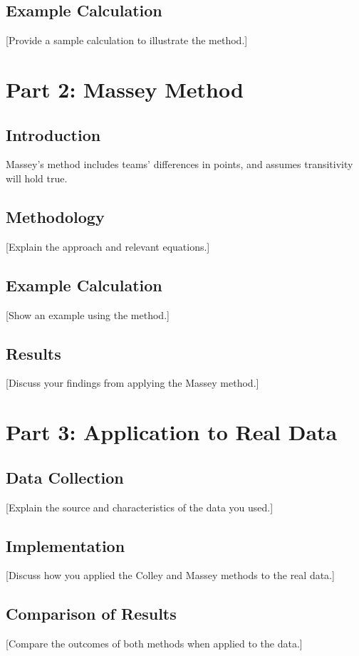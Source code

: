 \documentclass[12pt]{article}
\begin{document}
\subsection{Example Calculation}
[Provide a sample calculation to illustrate the method.]

\section{Part 2: Massey Method}
\subsection{Introduction}
Massey's method includes teams' differences in points, and assumes transitivity 
will hold true. 

\subsection{Methodology}
[Explain the approach and relevant equations.]

\subsection{Example Calculation}
[Show an example using the method.]

\subsection{Results}
[Discuss your findings from applying the Massey method.]

\section{Part 3: Application to Real Data}
\subsection{Data Collection}
[Explain the source and characteristics of the data you used.]

\subsection{Implementation}
[Discuss how you applied the Colley and Massey methods to the real data.]

\subsection{Comparison of Results}
[Compare the outcomes of both methods when applied to the data.]
\end{document}
